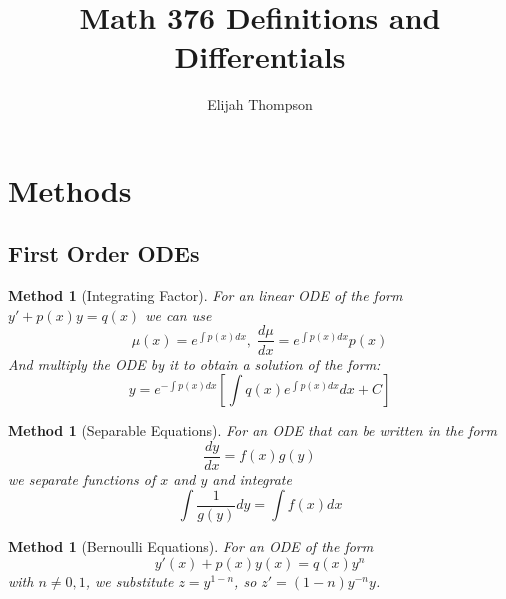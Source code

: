 \documentclass[12pt]{article}
\newtheorem{met}[thm]{Method}
\theoremstyle{definition}
\theoremstyle{remark}
\numberwithin{equation}{section}
\begin{document}

\title{Math 376 Definitions and Differentials}
\author{Elijah Thompson}
\maketitle

\tableofcontents


\clearpage

\section{Methods}

\subsection{First Order ODEs}

\begin{met}[Integrating Factor]
        For an linear ODE of the form $y'+p(x)y=q(x)$ we can use \begin{equation}
                \mu(x) = e^{\int p(x)dx},\;\frac{d\mu}{dx} = e^{\int p(x)dx}p(x)
        \end{equation}
        And multiply the ODE by it to obtain a solution of the form:    
        \begin{equation}
                y = e^{-\int p(x) dx}\left[\int q(x)e^{\int p(x)dx}dx + C \right]
        \end{equation}
\end{met}


\vspace{1cm}


\begin{met}[Separable Equations]
        For an ODE that can be written in the form \begin{equation}
                \frac{dy}{dx}=f(x)g(y)
        \end{equation}
        we separate functions of $x$ and $y$ and integrate \begin{equation}
                \int\frac{1}{g(y)}dy = \int f(x)dx
        \end{equation}
\end{met}


\vspace{1cm}


\begin{met}[Bernoulli Equations]
        For an ODE of the form\begin{equation}
                y'(x) + p(x)y(x) = q(x)y^n
        \end{equation}
        with $n \neq 0, 1$, we substitute $z = y^{1-n}$, so $z' =(1-n)y^{-n}y$.
\end{met}
\end{document}
